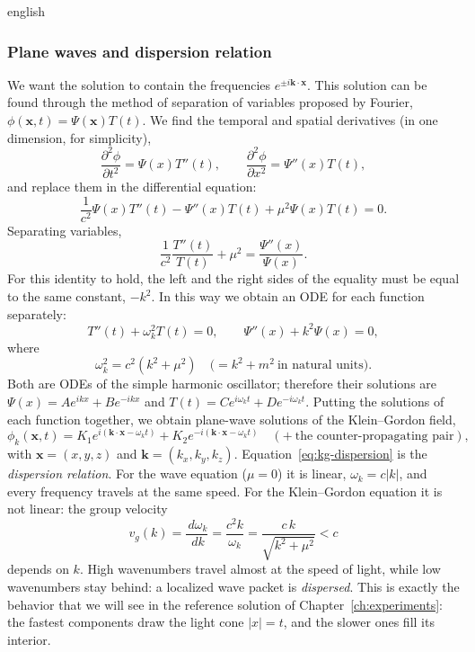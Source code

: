 \documentclass[11pt,letterpaper,twoside,openright]{book} %
\newcommand{\abs}[1]{\left\lvert #1 \right\rvert}
\begin{document}
\begin{hyphenrules}{english}
\subsubsection{Plane waves and dispersion relation}
We want the solution to contain the frequencies $e^{\pm i\mathbf{k}\cdot\mathbf{x}}$. This solution can be found
through the method of separation of variables proposed by Fourier, $\phi(\mathbf{x},t)=\Psi(\mathbf{x})T(t)$. We find
the temporal and spatial derivatives (in one dimension, for simplicity),
\begin{equation}
  \frac{\partial^2\phi}{\partial t^2}=\Psi(x)T''(t),\qquad
  \frac{\partial^2\phi}{\partial x^2}=\Psi''(x)T(t),
  \label{eq:kg-sep-1}
\end{equation}
and replace them in the differential equation:
\begin{equation}
  \frac{1}{c^2}\Psi(x)T''(t)-\Psi''(x)T(t)+\mu^2\Psi(x)T(t)=0.
  \label{eq:kg-sep-2}
\end{equation}
Separating variables,
\[
  \frac{1}{c^2}\frac{T''(t)}{T(t)}+\mu^2=\frac{\Psi''(x)}{\Psi(x)}.
\]
For this identity to hold, the left and the right sides of the equality must be equal to the same
constant, $-k^2$. In this way we obtain an ODE for each function separately:
\begin{equation}
  T''(t)+\omega_k^2T(t)=0,\qquad \Psi''(x)+k^2\Psi(x)=0,
  \label{eq:kg-odes}
\end{equation}
where
\begin{equation}
  \omega_k^2=c^2(k^2+\mu^2)\quad\big(=k^2+m^2\ \text{in natural units}\big).
  \label{eq:kg-dispersion}
\end{equation}
Both are ODEs of the simple harmonic oscillator; therefore their solutions are
$\Psi(x)=Ae^{ikx}+Be^{-ikx}$ and $T(t)=Ce^{i\omega_kt}+De^{-i\omega_kt}$. Putting the solutions of each
function together, we obtain plane-wave solutions of the Klein--Gordon field,
\begin{equation}
  \phi_k(\mathbf{x},t)=K_1e^{i(\mathbf{k}\cdot\mathbf{x}-\omega_kt)}+K_2e^{-i(\mathbf{k}\cdot\mathbf{x}-\omega_kt)}
  \quad(+\ \text{the counter-propagating pair}),
  \label{eq:kg-planewave}
\end{equation}
with $\mathbf{x}=(x,y,z)$ and $\mathbf{k}=(k_x,k_y,k_z)$. Equation~\eqref{eq:kg-dispersion} is the \emph{dispersion
relation}. For the wave equation ($\mu=0$) it is linear, $\omega_k=c\abs{k}$, and every frequency
travels at the same speed. For the Klein--Gordon equation it is not linear: the group velocity
\begin{equation}
  v_g(k)=\frac{\,d\omega_k}{\,d k}=\frac{c^2k}{\omega_k}=\frac{c\,k}{\sqrt{k^2+\mu^2}}<c
  \label{eq:kg-group-velocity}
\end{equation}
depends on $k$. High wavenumbers travel almost at the speed of light, while low wavenumbers stay behind:
a localized wave packet is \emph{dispersed}. This is exactly the behavior that we will see in the
reference solution of Chapter~\ref{ch:experiments}: the fastest components draw the light cone $\abs{x}=t$,
and the slower ones fill its interior.


\end{hyphenrules}
\end{document}
